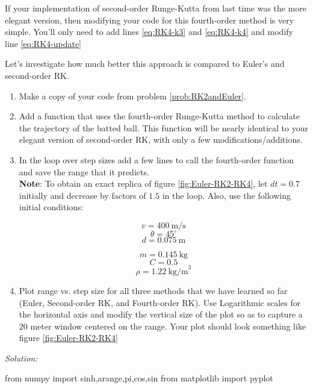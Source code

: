 If your implementation of second-order Runge-Kutta from last time was the more
elegant version, then modifying your code for this fourth-order method
is very simple.  You'll only need to add lines \eqref{eq:RK4-k3} and
\eqref{eq:RK4-k4} and modify line \eqref{eq:RK4-update}
\begin{enumerate}
  \probtwo Let's investigate how much better this approach is compared
  to Euler's and second-order RK.
\begin{enumerate}
\item Make a copy of your code from problem \ref{prob:RK2andEuler}.
\item Add a function that uses the fourth-order Runge-Kutta method to
  calculate the trajectory of the batted ball.  This function will be
  nearly identical to your elegant version of second-order RK, with
  only a few modifications/additions.
\item In the loop over step sizes add a few lines to call the
  fourth-order function and save the range that it predicts.\\
\textbf{Note}: To obtain an exact replica of figure \ref{fig:Euler-RK2-RK4},
let $dt = 0.7$ initially and decrease by factors of $1.5$ in the loop.
Also, use the following initial conditions:\\
\begin{minipage}{0.5\linewidth}
\[v = 400 \mathrm{~m/s}\]
\[\theta = 45^\circ\] 
\[d = 0.075 \mathrm{~m}\]
\end{minipage}
\begin{minipage}{0.5\linewidth}
\[m = 0.145\mathrm{~kg}\]
\[C = 0.5\] 
\[\rho = 1.22 \mathrm{~kg/m}^3\] 
\end{minipage}

\item Plot range vs. step size for all three methods that we have
  learned so far (Euler, Second-order RK, and Fourth-order RK).  Use
  Logarithmic scales for the horizontal axis and modify the vertical size of the
  plot so as to capture a $20$ meter window centered on the range.
  Your plot should look something like figure \ref{fig:Euler-RK2-RK4}
\end{enumerate}
\ifsolutions
\textit{Solution:}\\
\begin{codeexample}
\begin{VerbatimOut}{\listingFile}
from numpy import sinh,arange,pi,cos,sin
from matplotlib import pyplot




\end{VerbatimOut}
\end{codeexample}
\end{enumerate}
